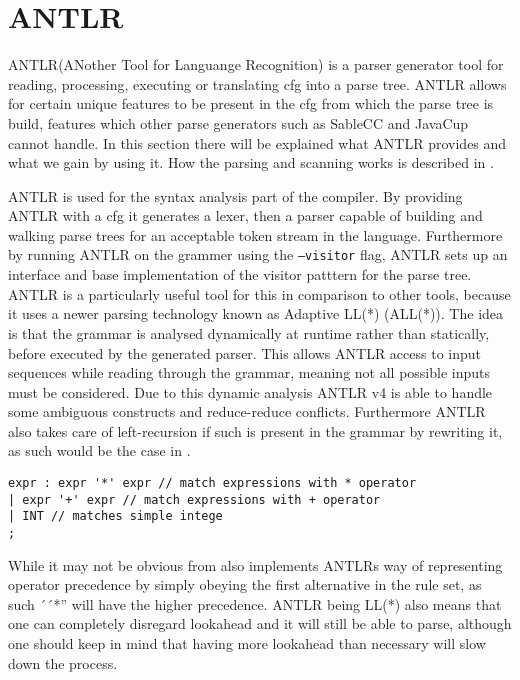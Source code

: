 \section{ANTLR}
ANTLR(ANother Tool for Languange Recognition) is a parser generator tool for reading, processing, executing or translating \gls{cfg} into a parse tree.
ANTLR allows for certain unique features to be present in the \gls{cfg} from which the parse tree is build, features which other parse generators such as SableCC and JavaCup cannot handle. %
In this section there will be explained what ANTLR provides and what we gain by using it.
How the parsing and scanning works is described in .

ANTLR is used for the syntax analysis part of the compiler.
By providing ANTLR with a \gls{cfg} it generates a lexer, then a parser capable of building and walking parse trees for an acceptable token stream in the language.
Furthermore by running ANTLR on the grammer using the \texttt{--visitor} flag, ANTLR sets up an interface and base implementation of the visitor patttern for the parse tree. 
ANTLR is a particularly useful tool for this in comparison to other tools, because it uses a newer parsing technology known as Adaptive LL(*) (ALL(*)).
The idea is that the grammar is analysed dynamically at runtime rather than statically, before executed by the generated parser.
This allows ANTLR access to input sequences while reading through the grammar, meaning not all possible inputs must be considered.
Due to this dynamic analysis ANTLR v4 is able to handle some ambiguous constructs and reduce-reduce conflicts.
Furthermore ANTLR also takes care of left-recursion if such is present in the grammar by rewriting it, as such would be the case in .

\begin{lstlisting}[caption=An ambiguous rule for expr,frame=tlrb,label={lst:amb}]
expr : expr '*' expr // match expressions with * operator
| expr '+' expr // match expressions with + operator
| INT // matches simple intege
;
\end{lstlisting}
While it may not be obvious from  also implements ANTLRs way of representing operator precedence by simply obeying the first alternative in the rule set, as such ´´*'' will have the higher precedence.
ANTLR being LL(*) also means that one can completely disregard lookahead and it will still be able to parse, although one should keep in mind that having more lookahead than necessary will slow down the process.\citep{ANTLR4}

